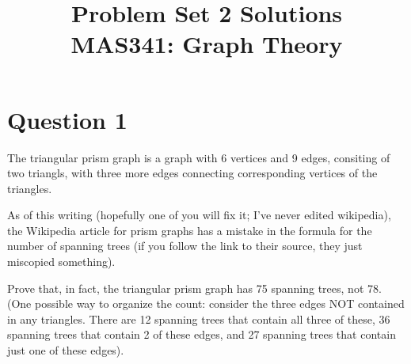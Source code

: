 \documentclass{amsart}
\title{Problem Set 2 Solutions \\ MAS341: Graph Theory }
\begin{document}
\maketitle
\section{Question 1}


The triangular prism graph is a graph with 6 vertices and 9 edges, consiting of two triangls, with three more edges connecting corresponding vertices of the triangles.

As of this writing (hopefully one of you will fix it; I've never edited wikipedia), the Wikipedia article for prism graphs has a mistake in the formula for the number of spanning trees (if you follow the link to their source, they just miscopied something).  

Prove that, in fact, the triangular prism graph has 75 spanning trees, not 78.  (One possible way to organize the count: consider the three edges NOT contained in any triangles.  There are 12 spanning trees that contain all three of these, 36 spanning trees that contain 2 of these edges, and 27 spanning trees that contain just one of these edges).
\end{document}
